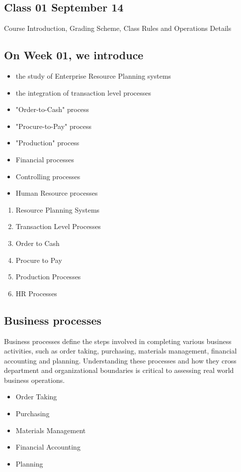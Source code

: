 \subsection {Class 01 September 14 }  
 
      Course Introduction, Grading Scheme, Class Rules and Operations Details
      \\
      \subsection{On Week 01, we introduce  }
      \begin{itemize}
          \item the study of Enterprise Resource Planning systems
          \item the integration of transaction level processes          
          \item "Order-to-Cash" process
          \item "Procure-to-Pay" process
          \item "Production"  process        
          \item Financial processes    
          \item Controlling processes    
          \item Human Resource processes          
    
      \end{itemize}

      \begin{enumerate}
          \item Resource Planning Systems
          \item Transaction Level Processes          
          \item Order to Cash          
          \item Procure to Pay    
          \item Production Processes              
          \item HR Processes              
      \end{enumerate}   
      
      \subsection * {Business processes }
         Business processes define the steps involved in completing various business activities, such as order taking, purchasing, materials management, financial accounting and planning. Understanding these processes and how they cross department and organizational boundaries is critical to assessing real world business operations.       
      \begin{itemize}
          \item Order Taking
          \item Purchasing
          \item Materials Management          
          \item Financial Accounting          
          \item Planning          
      \end{itemize}        